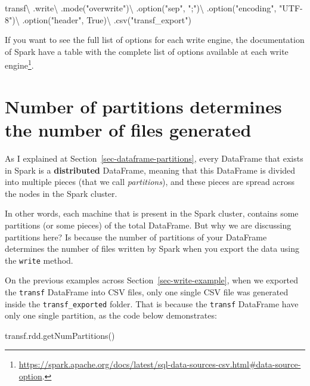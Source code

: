 \documentclass[
  11pt,
  letterpaper,
  DIV=11,
  numbers=noendperiod]{scrreprt}
\newenvironment{Shaded}{\begin{snugshade}}{\end{snugshade}}
\newcommand{\NormalTok}[1]{\textcolor[rgb]{0.00,0.23,0.31}{#1}}
\newcommand{\OperatorTok}[1]{\textcolor[rgb]{0.37,0.37,0.37}{#1}}
\newcommand{\StringTok}[1]{\textcolor[rgb]{0.13,0.47,0.30}{#1}}
\newcommand{\VariableTok}[1]{\textcolor[rgb]{0.07,0.07,0.07}{#1}}
\begin{document}
\begin{Shaded}
\begin{Highlighting}[]
\NormalTok{transf}\OperatorTok{\textbackslash{}}
\NormalTok{    .write}\OperatorTok{\textbackslash{}}
\NormalTok{    .mode(}\StringTok{"overwrite"}\NormalTok{)}\OperatorTok{\textbackslash{}}
\NormalTok{    .option(}\StringTok{"sep"}\NormalTok{, }\StringTok{";"}\NormalTok{)}\OperatorTok{\textbackslash{}}
\NormalTok{    .option(}\StringTok{"encoding"}\NormalTok{, }\StringTok{"UTF{-}8"}\NormalTok{)}\OperatorTok{\textbackslash{}}
\NormalTok{    .option(}\StringTok{"header"}\NormalTok{, }\VariableTok{True}\NormalTok{)}\OperatorTok{\textbackslash{}}
\NormalTok{    .csv(}\StringTok{"transf\_export"}\NormalTok{)}
\end{Highlighting}
\end{Shaded}

If you want to see the full list of options for each write engine, the
documentation of Spark have a table with the complete list of options
available at each write engine\footnote{\url{https://spark.apache.org/docs/latest/sql-data-sources-csv.html\#data-source-option}.}.

\section{Number of partitions determines the number of files
generated}\label{sec-export-partition-coalesce}

As I explained at Section~\ref{sec-dataframe-partitions}, every
DataFrame that exists in Spark is a \textbf{distributed} DataFrame,
meaning that this DataFrame is divided into multiple pieces (that we
call \emph{partitions}), and these pieces are spread across the nodes in
the Spark cluster.

In other words, each machine that is present in the Spark cluster,
contains some partitions (or some pieces) of the total DataFrame. But
why we are discussing partitions here? Is because the number of
partitions of your DataFrame determines the number of files written by
Spark when you export the data using the \texttt{write} method.

On the previous examples across Section~\ref{sec-write-example}, when we
exported the \texttt{transf} DataFrame into CSV files, only one single
CSV file was generated inside the \texttt{transf\_exported} folder. That
is because the \texttt{transf} DataFrame have only one single partition,
as the code below demonstrates:

\begin{Shaded}
\begin{Highlighting}[]
\NormalTok{transf.rdd.getNumPartitions()}
\end{Highlighting}
\end{Shaded}
\end{document}
